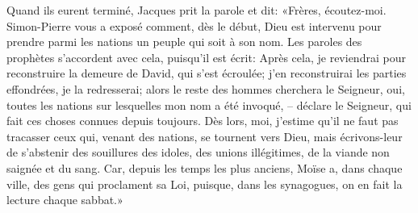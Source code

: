 Quand ils eurent terminé, Jacques prit la parole et dit:
	«Frères, écoutez-moi.
Simon-Pierre vous a exposé comment, dès le début,
	Dieu est intervenu pour prendre parmi les nations
	un peuple qui soit à son nom.
Les paroles des prophètes s’accordent avec cela, puisqu’il est écrit:
	Après cela,
	je reviendrai pour reconstruire la demeure de David, qui s’est écroulée;
	j’en reconstruirai les parties effondrées, je la redresserai;
	alors le reste des hommes cherchera le Seigneur,
	oui, toutes les nations sur lesquelles mon nom a été invoqué,
	– déclare le Seigneur, qui fait ces choses connues depuis toujours.
Dès lors, moi, j’estime qu’il ne faut pas tracasser
	ceux qui, venant des nations, se tournent vers Dieu,
	mais écrivons-leur de s’abstenir des souillures des idoles,
	des unions illégitimes, de la viande non saignée et du sang.
Car, depuis les temps les plus anciens,
	Moïse a, dans chaque ville, des gens qui proclament sa Loi,
	puisque, dans les synagogues, on en fait la lecture chaque sabbat.»
